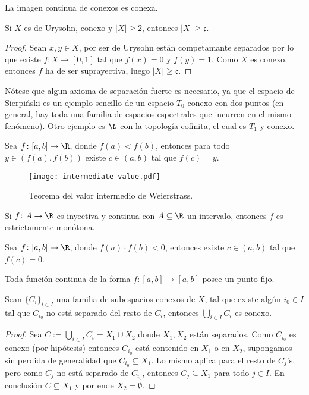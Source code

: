 \documentclass[topologia-analisis.tex]{subfiles}
\begin{document}
\begin{thm}
	La imagen continua de conexos es conexa.
\end{thm}

\begin{cor}
	Si $X$ es de Urysohn, conexo y $|X| \ge 2$, entonces $|X| \ge \mathfrak{c}$.
\end{cor}
\begin{proof}
	Sean $x, y \in X$, por ser de Urysohn están competamante separados por lo que existe $f\colon X \to [0, 1]$ tal que
	$f(x) = 0$ y $f(y) = 1$.
	Como $X$ es conexo, entonces $f$ ha de ser suprayectiva, luego $|X| \ge \mathfrak{c}$.
\end{proof}
Nótese que algun axioma de separación fuerte es necesario, ya que el espacio de Sierpiński es un ejemplo sencillo de un espacio $T_0$ conexo con dos puntos
(en general, hay toda una familia de espacios espectrales que incurren en el mismo fenómeno).
Otro ejemplo es $\N$ con la topología cofinita, el cual es $T_1$ y conexo.

\begin{thmi}
	Sea $f\colon [a,b] \to \R$, donde $f(a) < f(b)$, entonces para todo $y \in (f(a), f(b))$ existe $c\in (a, b)$ tal que $f(c) = y$.
\end{thmi}
\begin{figure}[!hbt]
	\centering
	\texttt{[image: intermediate-value.pdf]}
	\caption{Teorema del valor intermedio de Weierstrass.}
\end{figure}
\begin{cor}
	Si $f\colon A\to\R$ es inyectiva y continua con $A\subseteq\R$ un intervalo, entonces $f$ es estrictamente monótona.
\end{cor}

\begin{cor}[Bolzano]
	Sea $f\colon [a,b] \to \R$, donde $f(a)\cdot f(b) < 0$, entonces existe $c\in (a, b)$ tal que $f(c) = 0$.
\end{cor}
\begin{cor}
	Toda función continua de la forma $f\colon [a,b] \to [a,b]$ posee un punto fijo.
\end{cor}

\begin{thm}
	Sean $\{C_i\}_{i\in I}$ una familia de subespacios conexos de $X$, tal que existe algún $i_0 \in I$ tal que $C_{i_0}$ no está separado del resto de $C_i$,
	entonces $\bigcup_{i\in I} C_i$ es conexo.
\end{thm}
\begin{proof}
	Sea $C := \bigcup_{i\in I} C_i = X_1 \cup X_2$ donde $X_1,X_2$ están separados.
	Como $C_{i_0}$ es conexo (por hipótesis) entonces $C_{i_0}$ está contenido en $X_1$ o en $X_2$, supongamos sin perdida de generalidad que
	$C_{i_0} \subseteq X_1$.
	Lo mismo aplica para el resto de $C_j$'s, pero como $C_j$ no está separado de $C_{i_0}$, entonces $C_j \subseteq X_1$ para todo $j \in I$.
	En conclusión $C \subseteq X_1$ y por ende $X_2 = \emptyset$.
\end{proof}
\end{document}
